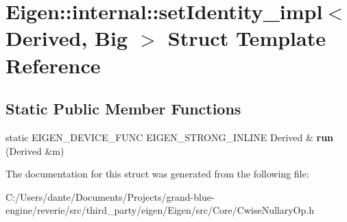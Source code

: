 \hypertarget{struct_eigen_1_1internal_1_1set_identity__impl}{}\section{Eigen\+::internal\+::set\+Identity\+\_\+impl$<$ Derived, Big $>$ Struct Template Reference}
\label{struct_eigen_1_1internal_1_1set_identity__impl}
\subsection*{Static Public Member Functions}
\begin{DoxyCompactItemize}
\item 
\mbox{\label{struct_eigen_1_1internal_1_1set_identity__impl_a1258fcb8a505a55e4e0b54077011f9e5}} 
static E\+I\+G\+E\+N\+\_\+\+D\+E\+V\+I\+C\+E\+\_\+\+F\+U\+NC E\+I\+G\+E\+N\+\_\+\+S\+T\+R\+O\+N\+G\+\_\+\+I\+N\+L\+I\+NE Derived \& {\bfseries run} (Derived \&m)
\end{DoxyCompactItemize}


The documentation for this struct was generated from the following file\+:\begin{DoxyCompactItemize}
\item 
C\+:/\+Users/dante/\+Documents/\+Projects/grand-\/blue-\/engine/reverie/src/third\+\_\+party/eigen/\+Eigen/src/\+Core/Cwise\+Nullary\+Op.\+h\end{DoxyCompactItemize}
